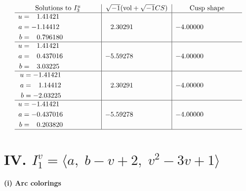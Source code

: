 \documentclass[1p]{elsarticle_modified}
\theoremstyle{definition}
\newcommand{\I}{\sqrt{-1}}
\begin{document}
$$\begin{array}{c|c|c}  
\text{Solutions to }I^u_{3}& \I (\text{vol} + \sqrt{-1}CS) & \text{Cusp shape}\\
 \hline 
\begin{aligned}
u &= \phantom{-}1.41421\phantom{ +0.000000I} \\
a &= -1.14412\phantom{ +0.000000I} \\
b &= \phantom{-}0.796180\phantom{ +0.000000I}\end{aligned}
 & \phantom{-}2.30291\phantom{ +0.000000I} & -4.00000\phantom{ +0.000000I} \\ \hline\begin{aligned}
u &= \phantom{-}1.41421\phantom{ +0.000000I} \\
a &= \phantom{-}0.437016\phantom{ +0.000000I} \\
b &= \phantom{-}3.03225\phantom{ +0.000000I}\end{aligned}
 & -5.59278\phantom{ +0.000000I} & -4.00000\phantom{ +0.000000I} \\ \hline\begin{aligned}
u &= -1.41421\phantom{ +0.000000I} \\
a &= \phantom{-}1.14412\phantom{ +0.000000I} \\
b &= -2.03225\phantom{ +0.000000I}\end{aligned}
 & \phantom{-}2.30291\phantom{ +0.000000I} & -4.00000\phantom{ +0.000000I} \\ \hline\begin{aligned}
u &= -1.41421\phantom{ +0.000000I} \\
a &= -0.437016\phantom{ +0.000000I} \\
b &= \phantom{-}0.203820\phantom{ +0.000000I}\end{aligned}
 & -5.59278\phantom{ +0.000000I} & -4.00000\phantom{ +0.000000I}\\
 \hline 
 \end{array}$$\newpage\newpage\renewcommand{\arraystretch}{1}
\centering \section*{IV. $I^v_{1}= \langle a,\;b- v+2,\;v^2-3 v+1 \rangle$}
\flushleft \textbf{(i) Arc colorings}\\
\end{document}
